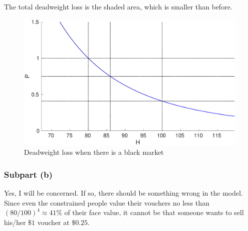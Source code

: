 \documentclass{article}
\begin{document}
The total deadweight loss is the shaded area, which is smaller than before.
\begin{figure}[!htbp]
	\centering
	\includegraphics[width=12cm]{figure3.eps}
	\caption{Deadweight loss when there is a black market}\label{fig3}
\end{figure}

\subsubsection{Subpart (b)}
Yes, I will be concerned. If so, there should be something wrong in the model. Since even the constrained people value their vouchers no less than $(80/100)^4\approx41\%$ of their face value, it cannot be that someone wants to sell his/her $\$1$ voucher at $\$0.25$.
\end{document}
